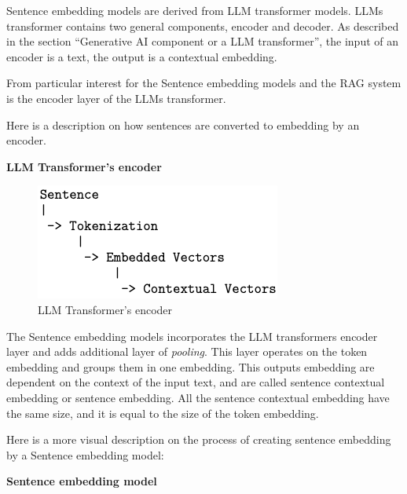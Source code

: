 \documentclass{wseas}
\begin{document}
Sentence embedding models are derived from LLM transformer models. LLMs
transformer contains two general components, encoder and decoder. As
described in the section ``Generative AI component or a LLM
transformer'', the input of an encoder is a text, the output is a
contextual embedding.

From particular interest for the Sentence embedding models and the RAG
system is the encoder layer of the LLMs transformer.

Here is a description on how sentences are converted to embedding by an
encoder.

\textbf{LLM Transformer's encoder}

\begin{figure}[htbp]{}
  \centering
  \includegraphics[width=\linewidth]{resources/v1/transformerEncoder.png}
  \caption{LLM Transformer's encoder}
  \label{fig:encoder_layer_figure}
\end{figure}

The Sentence embedding models incorporates the LLM transformers encoder
layer and adds additional layer of \emph{pooling}. This layer operates
on the token embedding and groups them in one embedding. This outputs
embedding are dependent on the context of the input text, and are called
sentence contextual embedding or sentence embedding. All the sentence
contextual embedding have the same size, and it is equal to the size of
the token embedding.


Here is a more visual description on the process of creating sentence
embedding by a Sentence embedding model:

\textbf{Sentence embedding model}
\end{document}
